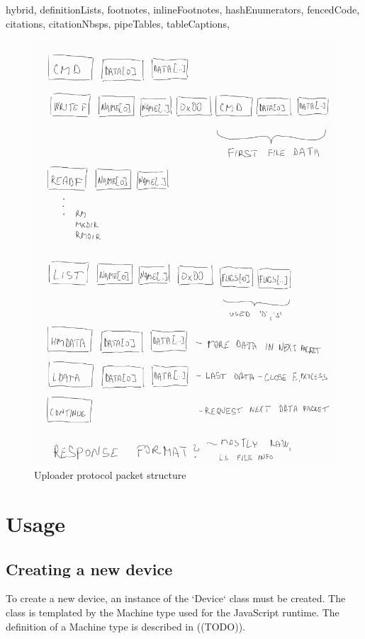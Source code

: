 \begin{markdown*}{%
  hybrid,
  definitionLists,
  footnotes,
  inlineFootnotes,
  hashEnumerators,
  fencedCode,
  citations,
  citationNbsps,
  pipeTables,
  tableCaptions,
}
\begin{figure}[!ht]
    \centering
    \includegraphics[width=\textwidth]{img/uploader-protocol}
    \caption{Uploader protocol packet structure}
    \label{fig:uploader-protocol}
\end{figure}


\section{Usage}

\subsection{Creating a new device}

To create a new device, an instance of the `Device` class must be created. The class is templated by the Machine type used for the JavaScript runtime. The definition of a Machine type is described in ((TODO)).


\end{markdown*}
